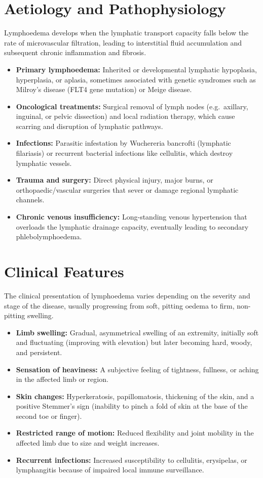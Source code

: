 \section*{Aetiology and Pathophysiology}
Lymphoedema develops when the lymphatic transport capacity falls below the rate of microvascular filtration, leading to interstitial fluid accumulation and subsequent chronic inflammation and fibrosis.
\begin{itemize}
    \item \textbf{Primary lymphoedema:} Inherited or developmental lymphatic hypoplasia, hyperplasia, or aplasia, sometimes associated with genetic syndromes such as Milroy's disease (FLT4 gene mutation) or Meige disease.
    \item \textbf{Oncological treatments:} Surgical removal of lymph nodes (e.g.\ axillary, inguinal, or pelvic dissection) and local radiation therapy, which cause scarring and disruption of lymphatic pathways.
    \item \textbf{Infections:} Parasitic infestation by Wuchereria bancrofti (lymphatic filariasis) or recurrent bacterial infections like cellulitis, which destroy lymphatic vessels.
    \item \textbf{Trauma and surgery:} Direct physical injury, major burns, or orthopaedic/vascular surgeries that sever or damage regional lymphatic channels.
    \item \textbf{Chronic venous insufficiency:} Long-standing venous hypertension that overloads the lymphatic drainage capacity, eventually leading to secondary phlebolymphoedema.
\end{itemize}

\section*{Clinical Features}
The clinical presentation of lymphoedema varies depending on the severity and stage of the disease, usually progressing from soft, pitting oedema to firm, non-pitting swelling.
\begin{itemize}
    \item \textbf{Limb swelling:} Gradual, asymmetrical swelling of an extremity, initially soft and fluctuating (improving with elevation) but later becoming hard, woody, and persistent.
    \item \textbf{Sensation of heaviness:} A subjective feeling of tightness, fullness, or aching in the affected limb or region.
    \item \textbf{Skin changes:} Hyperkeratosis, papillomatosis, thickening of the skin, and a positive Stemmer's sign (inability to pinch a fold of skin at the base of the second toe or finger).
    \item \textbf{Restricted range of motion:} Reduced flexibility and joint mobility in the affected limb due to size and weight increases.
    \item \textbf{Recurrent infections:} Increased susceptibility to cellulitis, erysipelas, or lymphangitis because of impaired local immune surveillance.
\end{itemize}

